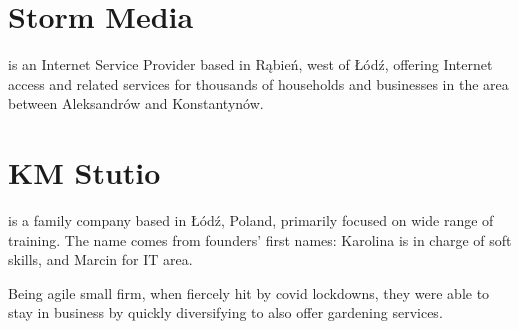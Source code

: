 \documentclass[%
               doublesided,
               paper=a4,
               fontsize=10pt
              ]{my-resume}
\begin{document}
{    \section{Storm Media}
        is an Internet Service Provider based in Rąbień, west of Łódź, offering Internet access
        and related services for thousands of households and businesses in the area between
        Aleksandrów and Konstantynów.
        
    \section{KM Stutio}
        is a family company based in Łódź, Poland, primarily focused on wide range of training.
        The name comes from founders'
        first names:
        Karolina is in charge of soft skills, and Marcin for IT area.
        
        Being agile small firm, when fiercely hit by covid lockdowns, they were able
        to stay in business by quickly diversifying to also offer gardening services.
    
    
}
\end{document}
